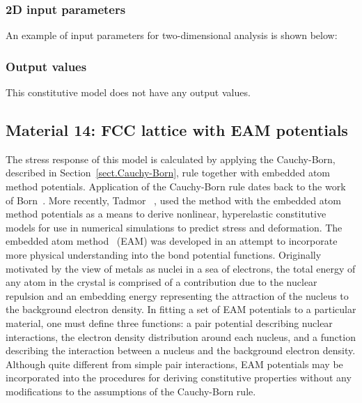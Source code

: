 \subsubsection{2D input parameters}
An example of input parameters for two-dimensional analysis is shown 
below:

\subsubsection{Output values}
This constitutive model does not have any output values.

\subsection{Material 14: FCC lattice with EAM potentials}
\label{sect.mat.FCC.EAM}
The stress response of this model is calculated by applying the 
Cauchy-Born, described in Section~\ref{sect.Cauchy-Born},
rule together with embedded atom method potentials.
Application of the Cauchy-Born rule dates back to the work
of Born~\cite{Born1940}.
More recently, Tadmor \etal~\cite{Tadmor1996}, used the method
with the embedded atom method potentials as a means to derive 
nonlinear, hyperelastic constitutive models
for use in numerical simulations to predict stress and deformation.
The embedded atom method~\cite{Daw1984} (EAM) was developed in an attempt
to incorporate more physical understanding into the bond potential functions.
Originally motivated by the view of metals as nuclei in a sea of electrons, the 
total energy of any atom in the crystal is comprised of a contribution due to the nuclear 
repulsion and an embedding energy representing the attraction of the nucleus to the 
background electron density. In fitting a set of EAM potentials to a particular
material, one must define three functions: a pair potential describing nuclear interactions, 
the electron density distribution around each nucleus, and a function describing the
interaction between a nucleus and the background electron density. Although quite
different from simple pair interactions, EAM potentials may be incorporated
into the procedures for deriving constitutive properties
without any modifications to the assumptions of the Cauchy-Born rule.

